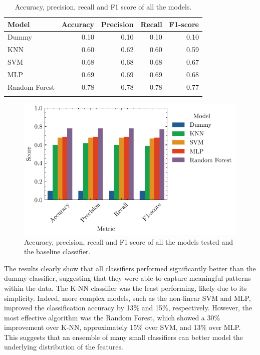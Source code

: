 \documentclass[journal]{IEEEtran}
\begin{document}
\begin{table}
\centering
\caption{Accuracy, precision, recall and F1 score of all the models.}
\begin{tabular}{lrrrr}
\toprule
Model & Accuracy & Precision & Recall & F1-score \\
\midrule
Dummy & 0.10 & 0.10 & 0.10 & 0.10 \\
KNN & 0.60 & 0.62 & 0.60 & 0.59 \\
SVM & 0.68 & 0.68 & 0.68 & 0.67 \\
MLP & 0.69 & 0.69 & 0.69 & 0.68 \\
Random Forest & 0.78 & 0.78 & 0.78 & 0.77 \\
\bottomrule
\hfill
\end{tabular}
\label{tab:scores}
\end{table}

\begin{figure}
    \centering
    \includegraphics[width=\linewidth]{model_comparison.pdf}
    \caption{Accuracy, precision, recall and F1 score of all the models tested and the baseline classifier.}
    \label{fig:model_comparison}
\end{figure}

The results clearly show that all classifiers performed significantly better than the dummy classifier, suggesting that they were able to capture meaningful patterns within the data. The K-NN classifier was the least performing, likely due to its simplicity. Indeed, more complex models, such as the non-linear SVM and MLP, improved the classification accuracy by 13\% and 15\%, respectively. However, the most effective algorithm was the Random Forest, which showed a 30\% improvement over K-NN, approximately 15\% over SVM, and 13\% over MLP. This suggests that an ensemble of many small classifiers can better model the underlying distribution of the features.
\end{document}
